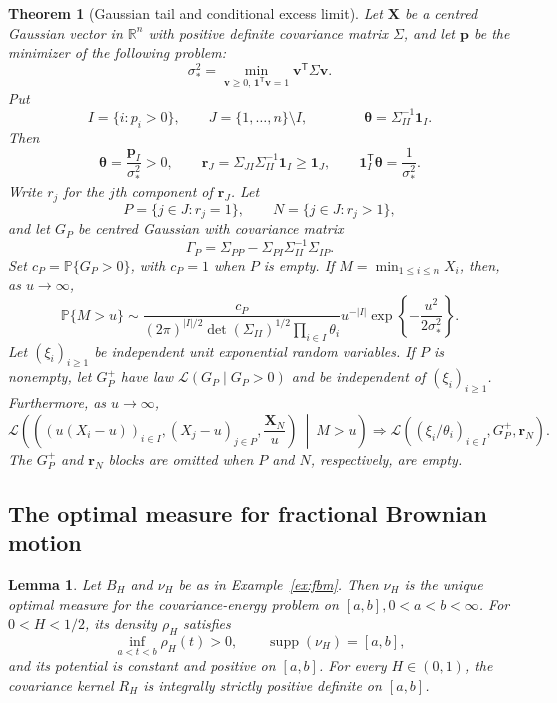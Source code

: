 \documentclass[11pt]{amsart}
\newtheorem{theorem}{Theorem}[section]
\newtheorem{lemma}[lemma]{Lemma}
\theoremstyle{definition}
\theoremstyle{remark}
\providecommand{\supp}{\operatorname{supp}}
\newcommand{\Pp}{\mathbb P}
\begin{document}
\begin{theorem}[Gaussian tail and conditional excess limit]
\label{thm:finite-gaussian}
Let $\boldsymbol X$ be a centred Gaussian vector in $\mathbb R^n$ with
positive definite covariance matrix $\Sigma$, and let $\boldsymbol p$ be
the minimizer of the following problem:
\[
 \sigma_*^2=\min_{\boldsymbol v\geq0,
             \,\boldsymbol1^{\mathsf T}\boldsymbol v=1}
             \boldsymbol v^{\mathsf T}\Sigma\boldsymbol v.
\]
Put
\[
 I=\{i:p_i>0\},\qquad J=\{1,\ldots,n\}\setminus I,
 \qquad  
 \qquad \boldsymbol\theta=\Sigma_{II}^{-1}\boldsymbol1_I.
\]
Then
\[
 \boldsymbol\theta=\frac{\boldsymbol p_I}{\sigma_*^2}>0,
 \qquad
 \boldsymbol r_J=\Sigma_{JI}\Sigma_{II}^{-1}\boldsymbol1_I\geq\boldsymbol1_J,
 \qquad
 \boldsymbol1_I^{\mathsf T}\boldsymbol\theta=\frac1{\sigma_*^2}.
\]
Write $r_j$ for the $j$th component of $\boldsymbol r_J$.
Let
\[
 P=\{j\in J:r_j=1\},\qquad N=\{j\in J:r_j>1\},
\]
and let $G_P$ be centred Gaussian with covariance matrix
\[
 \Gamma_P=\Sigma_{PP}-\Sigma_{PI}\Sigma_{II}^{-1}\Sigma_{IP}.
\]
Set $c_P=\Pp\{G_P>0\}$, with $c_P=1$ when $P$ is empty.  If
$M=\min_{1\leq i\leq n}X_i$, then, as $u\to\infty$,
\begin{equation}
 \Pp\{M>u\}\sim
 \frac{c_P}{(2\pi)^{|I|/2}\det(\Sigma_{II})^{1/2}
                  \prod_{i\in I}\theta_i}
 u^{-|I|}\exp\left\{-\frac{u^2}{2\sigma_*^2}\right\}.
 \label{eq:finite-gaussian-tail}
\end{equation}
Let $(\xi_i)_{i\geq1}$ be independent unit exponential random variables.
If $P$ is nonempty, let $G_P^+$ have law
$\mathcal L(G_P\mid G_P>0)$ and be independent of $(\xi_i)_{i\geq1}$.
Furthermore, as $u\to\infty$,
\begin{equation}
 \mathcal L\left(
 \left(
   (u(X_i-u))_{i\in I},
   (X_j-u)_{j\in P},
   \frac{\boldsymbol X_N}{u}
 \right)
   \ \middle|\ M>u\right)
 \Longrightarrow
 \mathcal L\left(
   (\xi_i/\theta_i)_{i\in I},
   G_P^+,
   \boldsymbol r_N
 \right).
 \label{eq:finite-gaussian-excess}
\end{equation}
The $G_P^+$ and $\boldsymbol r_N$ blocks are omitted
when $P$ and $N$, respectively, are empty.
\end{theorem}
 
\subsection{The optimal measure for fractional Brownian motion}

\begin{lemma}
\label{lem:fbm-optimal}
Let $B_H$ and $\nu_H$ be as in Example~\ref{ex:fbm}.  Then $\nu_H$ is
the unique optimal measure for the covariance-energy problem on $[a,b], 0< a<b<\infty$.
For $0<H<1/2$, its density $\rho_H$ satisfies
\[
 \inf_{a<t<b}\rho_H(t)>0,\qquad \supp(\nu_H)=[a,b],
\]
and its potential is constant and positive on $[a,b]$.
For every $H\in(0,1)$, the covariance kernel $R_H$ is integrally strictly
positive definite on $[a,b]$.
\end{lemma}
\end{document}

